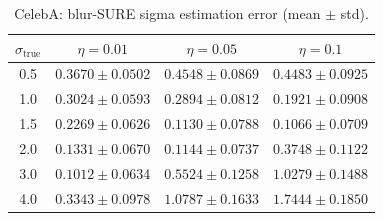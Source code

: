 \begin{table}[h]
\centering
\begin{tabular}{cccc}
\toprule
$\sigma_{\text{true}}$ & $\eta = 0.01$ & $\eta = 0.05$ & $\eta = 0.1$ \\
\midrule
0.5 & $0.3670 \pm 0.0502$ & $0.4548 \pm 0.0869$ & $0.4483 \pm 0.0925$ \\
1.0 & $0.3024 \pm 0.0593$ & $0.2894 \pm 0.0812$ & $0.1921 \pm 0.0908$ \\
1.5 & $0.2269 \pm 0.0626$ & $0.1130 \pm 0.0788$ & $0.1066 \pm 0.0709$ \\
2.0 & $0.1331 \pm 0.0670$ & $0.1144 \pm 0.0737$ & $0.3748 \pm 0.1122$ \\
3.0 & $0.1012 \pm 0.0634$ & $0.5524 \pm 0.1258$ & $1.0279 \pm 0.1488$ \\
4.0 & $0.3343 \pm 0.0978$ & $1.0787 \pm 0.1633$ & $1.7444 \pm 0.1850$ \\
\bottomrule
\end{tabular}
\caption{CelebA: blur-SURE sigma estimation error (mean $\pm$ std).}
\label{tab:sigma_error_celeba}
\end{table}
